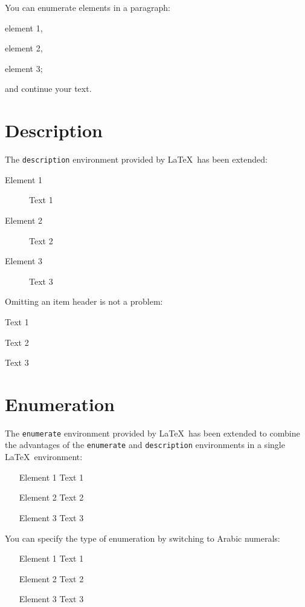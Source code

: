 \documentclass[english]{spimutbmphdthesis}
\begin{document}
You can enumerate elements in a paragraph: \begin{inlineenumeration}
\item element 1,
\item element 2,
\item element 3;
\end{inlineenumeration} and continue your text.

\section{Description}

The \texttt{description} environment provided by \LaTeX\ has been extended:
\begin{description}
\item[Element 1] Text 1
\item[Element 2] Text 2
\item[Element 3] Text 3
\end{description}

Omitting an item header is not a problem:
\begin{description}
\item[Element 1] Text 1
\item Text 2
\item[Element 3] Text 3
\end{description}

\section{Enumeration}

The \texttt{enumerate} environment provided by \LaTeX\ has been extended to combine the advantages of the \texttt{enumerate} and \texttt{description} environments in a single \LaTeX\ environment:
\begin{enumerate}
\item[Element 1] Text 1
\item[Element 2] Text 2
\item[Element 3] Text 3
\end{enumerate}

You can specify the type of enumeration by switching to Arabic numerals:
\begin{enumerate}[1]
\item[Element 1] Text 1
\item[Element 2] Text 2
\item[Element 3] Text 3
\end{enumerate}
\end{document}
